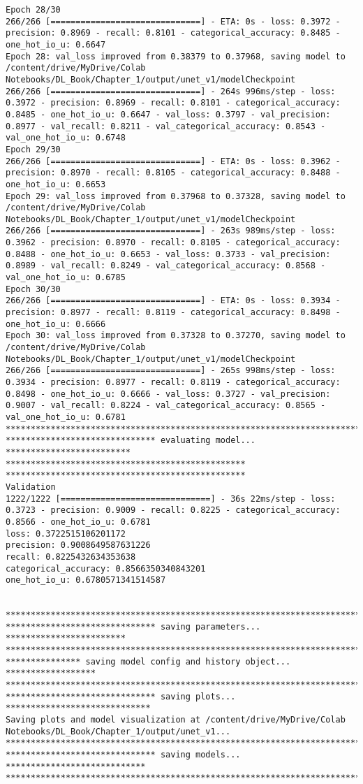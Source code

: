 \documentclass[
  letterpaper,
  DIV=11,
  numbers=noendperiod]{scrreprt}
\begin{document}
\begin{verbatim}
Epoch 28/30
266/266 [==============================] - ETA: 0s - loss: 0.3972 - precision: 0.8969 - recall: 0.8101 - categorical_accuracy: 0.8485 - one_hot_io_u: 0.6647
Epoch 28: val_loss improved from 0.38379 to 0.37968, saving model to /content/drive/MyDrive/Colab Notebooks/DL_Book/Chapter_1/output/unet_v1/modelCheckpoint
266/266 [==============================] - 264s 996ms/step - loss: 0.3972 - precision: 0.8969 - recall: 0.8101 - categorical_accuracy: 0.8485 - one_hot_io_u: 0.6647 - val_loss: 0.3797 - val_precision: 0.8977 - val_recall: 0.8211 - val_categorical_accuracy: 0.8543 - val_one_hot_io_u: 0.6748
Epoch 29/30
266/266 [==============================] - ETA: 0s - loss: 0.3962 - precision: 0.8970 - recall: 0.8105 - categorical_accuracy: 0.8488 - one_hot_io_u: 0.6653
Epoch 29: val_loss improved from 0.37968 to 0.37328, saving model to /content/drive/MyDrive/Colab Notebooks/DL_Book/Chapter_1/output/unet_v1/modelCheckpoint
266/266 [==============================] - 263s 989ms/step - loss: 0.3962 - precision: 0.8970 - recall: 0.8105 - categorical_accuracy: 0.8488 - one_hot_io_u: 0.6653 - val_loss: 0.3733 - val_precision: 0.8989 - val_recall: 0.8249 - val_categorical_accuracy: 0.8568 - val_one_hot_io_u: 0.6785
Epoch 30/30
266/266 [==============================] - ETA: 0s - loss: 0.3934 - precision: 0.8977 - recall: 0.8119 - categorical_accuracy: 0.8498 - one_hot_io_u: 0.6666
Epoch 30: val_loss improved from 0.37328 to 0.37270, saving model to /content/drive/MyDrive/Colab Notebooks/DL_Book/Chapter_1/output/unet_v1/modelCheckpoint
266/266 [==============================] - 265s 998ms/step - loss: 0.3934 - precision: 0.8977 - recall: 0.8119 - categorical_accuracy: 0.8498 - one_hot_io_u: 0.6666 - val_loss: 0.3727 - val_precision: 0.9007 - val_recall: 0.8224 - val_categorical_accuracy: 0.8565 - val_one_hot_io_u: 0.6781
****************************************************************************
****************************** evaluating model... *************************
************************************************
************************************************
Validation
1222/1222 [==============================] - 36s 22ms/step - loss: 0.3723 - precision: 0.9009 - recall: 0.8225 - categorical_accuracy: 0.8566 - one_hot_io_u: 0.6781
loss: 0.3722515106201172
precision: 0.9008649587631226
recall: 0.8225432634353638
categorical_accuracy: 0.8566350340843201
one_hot_io_u: 0.6780571341514587


****************************************************************************
****************************** saving parameters... ************************
****************************************************************************
*************** saving model config and history object... ******************
****************************************************************************
****************************** saving plots... *****************************
Saving plots and model visualization at /content/drive/MyDrive/Colab Notebooks/DL_Book/Chapter_1/output/unet_v1...
****************************************************************************
****************************** saving models... ****************************
****************************************************************************
\end{verbatim}
\end{document}
